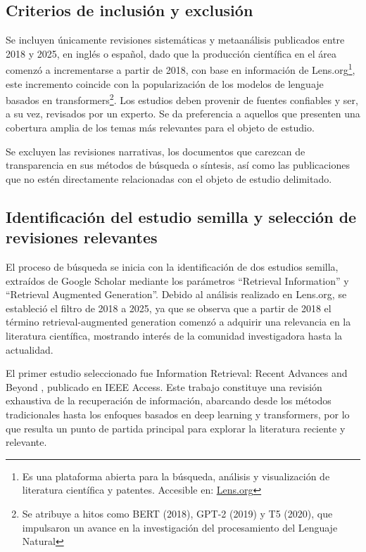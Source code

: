 \subsection{Criterios de inclusión y exclusión}
Se incluyen únicamente revisiones sistemáticas y metaanálisis publicados entre 2018 y 2025, en inglés o español, dado que la producción 
científica en el área comenzó a incrementarse a partir de 2018, con base en información de Lens.org\footnote{Es una plataforma abierta
para la búsqueda, análisis y visualización de literatura científica y patentes. Accesible en: \href{https://www.lens.org/}{Lens.org}}, este incremento coincide
con la popularización 
de los modelos de lenguaje basados en transformers\footnote{Se atribuye a hitos como BERT (2018), GPT-2 (2019) y T5 (2020), que impulsaron un avance 
en la investigación del procesamiento del Lenguaje Natural}.
Los estudios deben provenir de fuentes confiables y ser, a su vez, revisados por 
un experto. Se da preferencia a aquellos que presenten una cobertura amplia de los temas más relevantes para el objeto de estudio.  

Se excluyen las revisiones narrativas, los documentos que carezcan de transparencia en sus métodos de búsqueda o síntesis, así como las publicaciones que no estén 
directamente relacionadas con el objeto de estudio delimitado.

\subsection{Identificación del estudio semilla y selección de revisiones relevantes}
El proceso de búsqueda se inicia con la identificación de dos estudios semilla, extraídos de Google Scholar mediante los parámetros “Retrieval Information” y “Retrieval Augmented Generation”. 
Debido al análisis realizado en Lens.org, se estableció el filtro de 2018 a 2025, ya que se observa que a partir de 2018 el término retrieval-augmented generation 
comenzó a adquirir una relevancia en la literatura científica, mostrando interés de la comunidad investigadora hasta la actualidad.

El primer estudio seleccionado fue Information Retrieval: Recent Advances and Beyond \textcite{hambarde2023ir}, publicado en IEEE Access. 
Este trabajo constituye una revisión exhaustiva de la recuperación de información, abarcando desde los métodos tradicionales hasta los enfoques 
basados en deep learning y transformers, por lo que resulta un punto de partida principal para explorar la literatura reciente y relevante.

